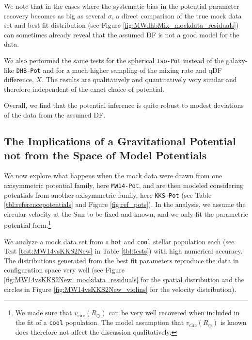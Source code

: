 \documentclass[iop,revtex4,numberedappendix,appendixfloats]{emulateapj}
\begin{document}
We note that in the cases where the systematic bias in the potential parameter recovery becomes as big as several $\sigma$, a direct comparison of the true mock data set and best fit distribution (see Figure \ref{fig:MWdhbMix_mockdata_residuals}) can sometimes already reveal that the assumed DF is not a good model for the data.

We also performed the same tests for the spherical \texttt{Iso-Pot} instead of the galaxy-like \texttt{DHB-Pot} and for a much higher sampling of the mixing rate and qDF difference, $X$. The results are qualitatively and quantitatively very similar and therefore independent of the exact choice of potential.

Overall, we find that the potential inference is quite robust to modest deviations of the data from the assumed DF. 


\subsection{The Implications of a Gravitational Potential not from the Space of Model Potentials} \label{sec:results_potential}

We now explore what happens when the mock data were drawn from one axisymmetric potential family, here \texttt{MW14-Pot}, and are then modeled considering potentials from another axisymmetric family, here \texttt{KKS-Pot} (see Table \ref{tbl:referencepotentials} and Figure \ref{fig:ref_pots}). In the analysis, we assume the circular velocity at the Sun to be fixed and known, and we only fit the parametric potential form.\footnote{We made sure that $v_\text{circ}(R_\odot)$ can be very well recovered when included in the fit of a \texttt{cool} population. The model assumption that $v_\text{circ}(R_\odot)$ is known does therefore not affect the discussion qualitatively.}

We analyze a mock data set from a \texttt{hot} and \texttt{cool} stellar population each (see Test \ref{test:MW14vsKKS2New} in Table \ref{tbl:tests}) with high numerical accuracy. The distributions generated from the best fit parameters reproduce the data in configuration space very well (see Figure \ref{fig:MW14vsKKS2New_mockdata_residuals} for the spatial distribution and the circles in Figure \ref{fig:MW14vsKKS2New_violins} for the velocity distribution).
\end{document}
